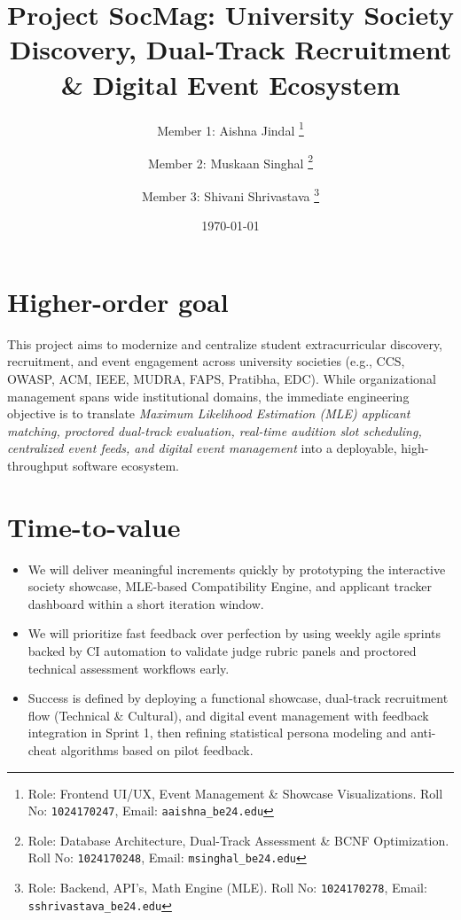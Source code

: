 \documentclass[11pt,a4paper]{article}
\title{Project SocMag: University Society Discovery, Dual-Track Recruitment \& Digital Event Ecosystem}
\author{
  Member 1: Aishna Jindal%
  \thanks{Role: Frontend UI/UX, Event Management \& Showcase Visualizations. Roll No: \texttt{1024170247}, %
    Email: \texttt{aaishna\_be24\@thapar.edu}}
  \and 
  Member 2: Muskaan Singhal%
  \thanks{Role: Database Architecture, Dual-Track Assessment \& BCNF Optimization. Roll No: \texttt{1024170248}, %
    Email: \texttt{msinghal\_be24\@thapar.edu}}
  \and 
  Member 3: Shivani Shrivastava%
  \thanks{Role: Backend, API's, Math Engine (MLE). Roll No: \texttt{1024170278}, %
    Email: \texttt{sshrivastava\_be24\@thapar.edu}}
}
\date{\today}
\begin{document}
\maketitle

\section{Higher-order goal}
This project aims to modernize and centralize student extracurricular discovery, recruitment, and event engagement across university societies (e.g., CCS, OWASP, ACM, IEEE, MUDRA, FAPS, Pratibha, EDC). While organizational management spans wide institutional domains, the immediate engineering objective is to translate \emph{Maximum Likelihood Estimation (MLE) applicant matching, proctored dual-track evaluation, real-time audition slot scheduling, centralized event feeds, and digital event management} into a deployable, high-throughput software ecosystem.

\section{Time-to-value}
\begin{itemize}[leftmargin=0.7cm]
    \item We will deliver meaningful increments quickly by prototyping the interactive society showcase, MLE-based Compatibility Engine, and applicant tracker dashboard within a short iteration window.
    \item We will prioritize fast feedback over perfection by using weekly agile sprints backed by CI automation to validate judge rubric panels and proctored technical assessment workflows early.
    \item Success is defined by deploying a functional showcase, dual-track recruitment flow (Technical \& Cultural), and digital event management with feedback integration in Sprint 1, then refining statistical persona modeling and anti-cheat algorithms based on pilot feedback.
\end{itemize}
\end{document}
